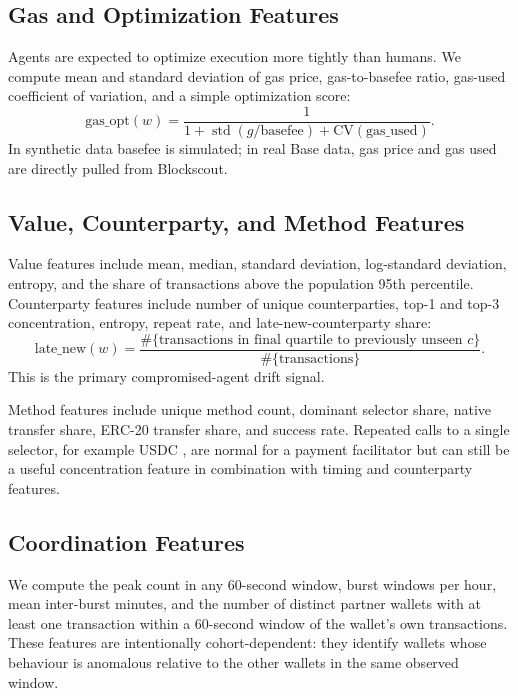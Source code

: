 \documentclass[11pt]{article}
\newcommand{\code}[1]{\texttt{\detokenize{#1}}}
\begin{document}
\subsection{Gas and Optimization Features}

Agents are expected to optimize execution more tightly than humans.  We compute
mean and standard deviation of gas price, gas-to-basefee ratio, gas-used
coefficient of variation, and a simple optimization score:
\[
  \mathrm{gas\_opt}(w)=
  \frac{1}{1+\operatorname{std}(g/\mathrm{basefee})+\mathrm{CV}(\mathrm{gas\_used})}.
\]
In synthetic data basefee is simulated; in real Base data, gas price and gas
used are directly pulled from Blockscout.

\subsection{Value, Counterparty, and Method Features}

Value features include mean, median, standard deviation, log-standard
deviation, entropy, and the share of transactions above the population 95th
percentile.  Counterparty features include number of unique counterparties,
top-1 and top-3 concentration, entropy, repeat rate, and late-new-counterparty
share:
\[
  \mathrm{late\_new}(w)=
  \frac{\#\{ \text{transactions in final quartile to previously unseen } c\}}
       {\#\{\text{transactions}\}}.
\]
This is the primary compromised-agent drift signal.

Method features include unique method count, dominant selector share, native
transfer share, ERC-20 transfer share, and success rate.  Repeated calls to a
single selector, for example USDC \code{transferWithAuthorization}, are normal
for a payment facilitator but can still be a useful concentration feature in
combination with timing and counterparty features.

\subsection{Coordination Features}

We compute the peak count in any 60-second window, burst windows per hour, mean
inter-burst minutes, and the number of distinct partner wallets with at least
one transaction within a 60-second window of the wallet's own transactions.
These features are intentionally cohort-dependent: they identify wallets whose
behaviour is anomalous relative to the other wallets in the same observed
window.
\end{document}
